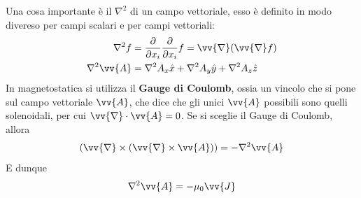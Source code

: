 \documentclass[a4paper, oneside]{article}
\begin{document}
Una cosa importante è il $\nabla^{2}$ di un campo vettoriale, esso è definito in modo 
divereso per campi scalari e per campi vettoriali:
\begin{align*}
    \nabla^{2} f &= \frac{\partial }{\partial x_i} \frac{\partial }{\partial x_i}f = \vv{\nabla} (\vv{\nabla}f ) \\
    \nabla^{2} \vv{A} &= \nabla^{2}A_x \hat{x} + \nabla^{2} A_y \hat{y} + \nabla^{2} A_z \hat{z}   
\end{align*}
In magnetostatica si utilizza il \textbf{Gauge di Coulomb}, ossia un vincolo che si pone 
sul campo vettoriale $\vv{A}$, che dice che gli unici $\vv{A}$ possibili sono quelli solenoidali, 
per cui $\vv{\nabla} \cdot \vv{A} = 0$. Se si sceglie il Gauge di Coulomb, allora 
\begin{align}
    (\vv{\nabla} \times (\vv{\nabla} \times \vv{A}  ) ) = -\nabla^{2}\vv{A} 
\end{align}
E dunque 
\begin{align}
    \nabla^{2} \vv{A} = - \mu_0 \vv{J}  
\end{align}
\end{document}
